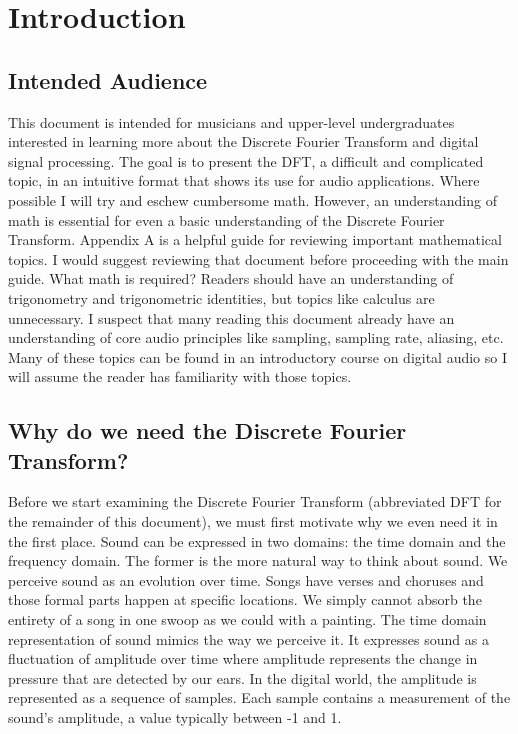 \section*{Introduction}

\subsection*{Intended Audience}

This document is intended for musicians and upper-level undergraduates interested in learning more about the Discrete Fourier Transform 
and digital signal processing.  The goal is to present the DFT, a difficult and complicated topic, in an 
intuitive format that shows its use for audio applications.  Where possible I will try and eschew 
cumbersome math.  However, an understanding of math is essential for even a basic understanding of
the Discrete Fourier Transform.  Appendix A is a helpful guide for reviewing important mathematical
topics.  I would suggest reviewing that document before proceeding with the main guide.  What
math is required?   Readers should have an understanding of trigonometry
and trigonometric identities, but topics like calculus are unnecessary.  I suspect that
many reading this document already have an understanding of core audio principles like sampling, sampling
rate, aliasing, etc.  Many of these topics can be found in an introductory course on digital audio so I will assume
the reader has familiarity with those topics.

\subsection*{Why do we need the Discrete Fourier Transform?}

Before we start examining the Discrete Fourier Transform (abbreviated DFT for the remainder
of this document), we must first motivate why we even need it in the first place.  Sound can be expressed
in two domains: the time domain and the frequency domain.  The former is the more natural way to think 
about sound.  We perceive sound as an evolution over time.  Songs have verses and choruses and those
formal parts happen at specific locations.  We simply cannot absorb the entirety of a song in one
swoop as we could with a painting.  The time domain representation of sound mimics the way we 
perceive it.  It expresses sound as a fluctuation of amplitude over time where amplitude represents
the change in pressure that are detected by our ears.  In the digital world, the amplitude is represented 
as a sequence of samples.  Each sample contains a measurement of the sound's amplitude, a value 
typically between -1 and 1.

